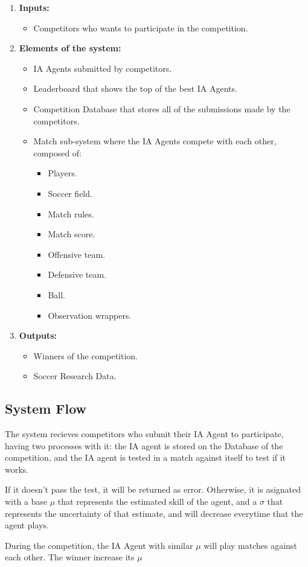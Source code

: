 \begin{enumerate}

    \item \textbf{Inputs:}
    \begin{itemize}
        \item Competitors who wants to participate in the competition.
    \end{itemize}

    \item \textbf{Elements of the system:}
    \begin{itemize}
        \item IA Agents submitted by competitors.
        \item Leaderboard that shows the top of the best IA Agents.
        \item Competition Database that stores all of the submissions made by the competitors.
        \item Match sub-system where the IA Agents compete with each other, composed of:
        \begin{itemize}
            \item Players.
            \item Soccer field.
            \item Match rules.
            \item Match score.
            \item Offensive team.
            \item Defensive team.
            \item Ball.
            \item Observation wrappers.
        \end{itemize}
    \end{itemize}

    \item \textbf{Outputs:}
    \begin{itemize}
        \item Winners of the competition.
        \item Soccer Research Data.
    \end{itemize}
\end{enumerate}

\subsection*{System Flow}

The system recieves competitors who submit their IA Agent to participate, having two processes with it: the IA agent is stored on the Database of the competition, and the IA agent is tested in a match against itself to test if it works.

If it doesn't pass the test, it will be returned as error. Otherwise, it is asignated with a base $\mu$ that represents the estimated skill of the agent, and a $\sigma$ that represents the uncertainty of that estimate, and will decrease everytime that the agent plays.

During the competition, the IA Agent with similar $\mu$ will play matches against each other. The winner increase its $\mu$